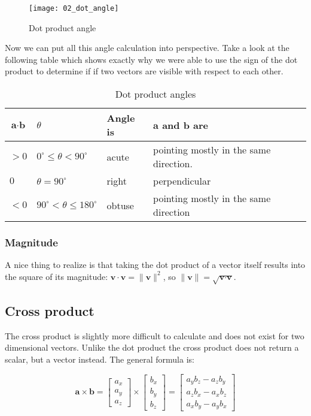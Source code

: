 \begin{figure}[H]
\centering
    \texttt{[image: 02\_dot\_angle]}
\caption{Dot product angle}
\label{fig:dot-product-angle}
\end{figure}

Now we can put all this angle calculation into perspective. Take a look at the following table which shows exactly why we were able to use the sign of the dot product to determine if if two vectors are visible with respect to each other.

\begin{table}[H]
\centering
\begin{tabular}{|l|l|l|l|l|}
\hline
$\textbf{a}\cdot\textbf{b}$ & $\theta$ & \textbf{Angle is} & $\textbf{a}$ \textbf{and} $\textbf{b}$ \textbf{are}  \\ \hline
$>0$ & $0^\circ \leq \theta < 90^\circ$ & acute & pointing mostly in the same direction. \\ \hline
$0$ & $\theta=90^\circ$ & right & perpendicular \\ \hline
$<0$ & $90^\circ < \theta \leq 180^\circ$ & obtuse & pointing mostly in the same direction \\ \hline
\end{tabular}
\caption{Dot product angles}
\label{tab:dot-product-angles}
\end{table}

\subsubsection{Magnitude}

A nice thing to realize is that taking the dot product of a vector itself results into the square of its magnitude: $\textbf{v}\cdot\textbf{v}=\|\textbf{v}\|^2$, so $\|\textbf{v}\|=\sqrt{\textbf{v}\cdot\textbf{v}}$.

\subsection{Cross product}

The cross product is slightly more difficult to calculate and does not exist for two dimensional vectors. Unlike the dot product the cross product does not return a scalar, but a vector instead. The general formula is:

$$
\textbf{a}\times\textbf{b}=
\begin{bmatrix}
a_x \\ a_y \\ a_z
\end{bmatrix}\times
\begin{bmatrix}
b_x \\ b_y \\ b_z
\end{bmatrix}=
\begin{bmatrix}
a_yb_z - a_zb_y \\ a_zb_x - a_xb_z \\ a_xb_y - a_yb_x
\end{bmatrix}
$$

